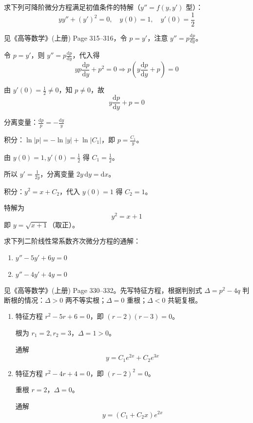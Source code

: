 \documentclass[answer]{THUExam}
\begin{document}
\begin{problem}
求下列可降阶微分方程满足初值条件的特解（$y'' = f(y, y')$ 型）：
$$yy'' + (y')^2 = 0, \quad y(0) = 1, \quad y'(0) = \frac{1}{2}$$
\end{problem}
\begin{note}
    见《高等数学》(上册) Page 315--316，令 $p = y'$，注意 $y'' = p\frac{\mathrm{d}p}{\mathrm{d}y}$。
\end{note}
\begin{solution}
    令 $p = y'$，则 $y'' = p\frac{\mathrm{d}p}{\mathrm{d}y}$，代入得
    $$yp\frac{\mathrm{d}p}{\mathrm{d}y} + p^2 = 0 \Rightarrow p\left(y\frac{\mathrm{d}p}{\mathrm{d}y} + p\right) = 0$$
    
    由 $y'(0) = \frac{1}{2} \neq 0$，知 $p \neq 0$，故
    $$y\frac{\mathrm{d}p}{\mathrm{d}y} + p = 0$$
    
    分离变量：$\frac{\mathrm{d}p}{p} = -\frac{\mathrm{d}y}{y}$
    
    积分：$\ln|p| = -\ln|y| + \ln|C_1|$，即 $p = \frac{C_1}{y}$。
    
    由 $y(0)=1, y'(0)=\frac{1}{2}$ 得 $C_1 = \frac{1}{2}$。
    
    所以 $y' = \frac{1}{2y}$，分离变量 $2y\,\mathrm{d}y = \mathrm{d}x$。
    
    积分：$y^2 = x + C_2$，代入 $y(0)=1$ 得 $C_2=1$。
    
    特解为
    $$\boxed{y^2 = x + 1}$$
    即 $y = \sqrt{x+1}$（取正）。
\end{solution}
\bigskip

\begin{problem}
求下列二阶线性常系数齐次微分方程的通解：
\begin{enumerate}
    \item $y'' - 5y' + 6y = 0$
    \item $y'' - 4y' + 4y = 0$
\end{enumerate}
\end{problem}
\begin{note}
    见《高等数学》(上册) Page 330--332。先写特征方程，根据判别式 $\Delta = p^2-4q$ 判断根的情况：$\Delta>0$ 两不等实根；$\Delta=0$ 重根；$\Delta<0$ 共轭复根。
\end{note}
\begin{solution}
    \begin{enumerate}
        \item 特征方程 $r^2 - 5r + 6 = 0$，即 $(r-2)(r-3)=0$。
        
        根为 $r_1=2, r_2=3$，$\Delta=1>0$。
        
        通解
        $$\boxed{y = C_1e^{2x} + C_2e^{3x}}$$
        
        \item 特征方程 $r^2 - 4r + 4 = 0$，即 $(r-2)^2=0$。
        
        重根 $r=2$，$\Delta=0$。
        
        通解
        $$\boxed{y = (C_1 + C_2x)e^{2x}}$$
    \end{enumerate}
\end{solution}
\end{document}
